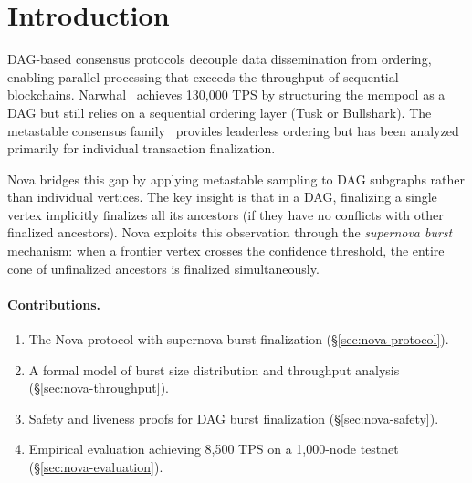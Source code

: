 \section{Introduction}

\label{sec:nova-introduction}

DAG-based consensus protocols decouple data dissemination from ordering, enabling
parallel processing that exceeds the throughput of sequential blockchains.
Narwhal~\cite{danezis2022narwhal} achieves 130,000 TPS by structuring the mempool
as a DAG but still relies on a sequential ordering layer (Tusk or Bullshark).
The metastable consensus family~\cite{rocket2019wave} provides leaderless ordering
but has been analyzed primarily for individual transaction finalization.

Nova bridges this gap by applying metastable sampling to DAG subgraphs rather than
individual vertices. The key insight is that in a DAG, finalizing a single vertex
implicitly finalizes all its ancestors (if they have no conflicts with other finalized
ancestors). Nova exploits this observation through the \emph{supernova burst} mechanism:
when a frontier vertex crosses the confidence threshold, the entire cone of unfinalized
ancestors is finalized simultaneously.

\paragraph{Contributions.}
\begin{enumerate}[nosep]
\item The Nova protocol with supernova burst finalization (\S\ref{sec:nova-protocol}).
\item A formal model of burst size distribution and throughput analysis (\S\ref{sec:nova-throughput}).
\item Safety and liveness proofs for DAG burst finalization (\S\ref{sec:nova-safety}).
\item Empirical evaluation achieving 8,500 TPS on a 1,000-node testnet (\S\ref{sec:nova-evaluation}).
\end{enumerate}

